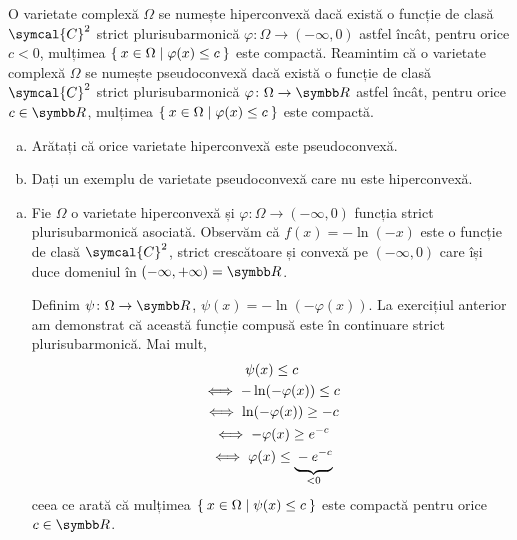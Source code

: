 \begin{problem}
O varietate complexă \(\Omega\) se numește hiperconvexă dacă există o funcție de clasă \(\symcal{C}^2\) strict plurisubarmonică \(\varphi \colon \Omega \to (-\infty, 0)\) astfel încât, pentru orice \(c < 0\), mulțimea \(\Set{ x \in \Omega | \varphi(x) \leq c }\) este compactă. Reamintim că o varietate complexă \(\Omega\) se numește pseudoconvexă dacă există o funcție de clasă \(\symcal{C}^2\) strict plurisubarmonică \(\varphi \colon \Omega \to \reals\) astfel încât, pentru orice \(c \in \reals\), mulțimea \(\Set{ x \in \Omega | \varphi(x) \leq c }\) este compactă.

\begin{enumerate}[a)]
    \item Arătați că orice varietate hiperconvexă este pseudoconvexă.
    \item Dați un exemplu de varietate pseudoconvexă care nu este hiperconvexă.
\end{enumerate}
\end{problem}
\begin{solution}
\begin{enumerate}[a)]
    \item Fie \(\Omega\) o varietate hiperconvexă și \(\varphi \colon \Omega \to (-\infty, 0)\) funcția strict plurisubarmonică asociată. Observăm că \(f(x) = -\ln(-x)\) este o funcție de clasă \(\symcal{C}^2\), strict crescătoare și convexă pe \((-\infty, 0)\) care își duce domeniul în \((-\infty, +\infty) = \reals\).
    
    Definim \(\psi \colon \Omega \to \reals\), \(\psi(x) = -\ln(-\varphi(x))\). La exercițiul anterior am demonstrat că această funcție compusă este în continuare strict plurisubarmonică. Mai mult,
    \begin{gather*}
        \psi(x) \leq c \\
        \iff -\ln(-\varphi(x)) \leq c \\
        \iff \ln(-\varphi(x)) \geq -c \\
        \iff -\varphi(x) \geq e^{-c} \\
        \iff \varphi(x) \leq \underbrace{\strut -e^{-c}}_{< 0}
    \end{gather*}
    ceea ce arată că mulțimea \(\Set{ x \in \Omega | \psi(x) \leq c }\) este compactă pentru orice \(c \in \reals\).

\end{enumerate}
\end{solution}

